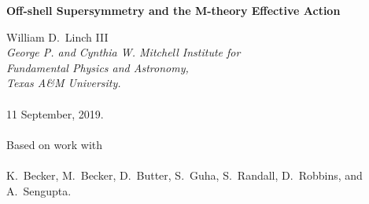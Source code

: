 \documentclass[a4paper,12pt]{article} %
\begin{document}
\nopagecolor


\vspace{10mm}
\begin{center}
\Large \textbf {
Off-shell Supersymmetry and the M-theory Effective Action
}
\end{center} 
\vspace{5mm}
\begin{center} 
{
William D.\ Linch III
}
\\[5mm]
{
{\em George P. and Cynthia W. Mitchell Institute for\\
Fundamental Physics and Astronomy, \\
Texas A\&{}M University.}\\
~\\
11 September, 2019.\\
~\\
Based on work 
with \\
~\\
K.\ Becker, 
M.\ Becker, 
D.\ Butter, 
S.\ Guha, 
S.\ Randall, 
D.\ Robbins,
and
A.\ Sengupta.
}
\end{center} 

\vspace{10pt}


\begin{abstract}
These are notes for a seminar in the Theory Group at Masaryk University delivered on 8 October, 2019.
\end{abstract}

\thispagestyle{empty}
\newpage
\end{document}
